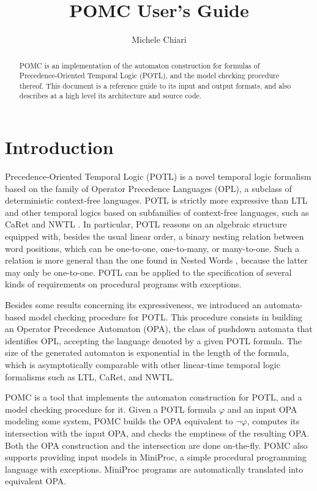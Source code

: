 \documentclass[9pt,a4paper]{article}
\title{POMC User's Guide}
\author{Michele Chiari}
\date{}
\begin{document}
\maketitle

\begin{abstract}
POMC is an implementation of the automaton construction for formulas
of Precedence-Oriented Temporal Logic (POTL), and the model checking
procedure thereof.
This document is a reference guide to its input and output formats,
and also describes at a high level its architecture and source code.
\end{abstract}

\section{Introduction}

Precedence-Oriented Temporal Logic (POTL) \cite{ChiariMP21} is a novel temporal
logic formalism based on the family of Operator Precedence Languages (OPL),
a subclass of deterministic context-free languages.
POTL is strictly more expressive than LTL and other temporal logics based
on subfamilies of context-free languages, such as CaRet \cite{AlurEM04}
and NWTL \cite{lmcs/AlurABEIL08}.
In particular, POTL reasons on an algebraic structure equipped with,
besides the usual linear order, a binary nesting relation between word positions,
which can be one-to-one, one-to-many, or many-to-one.
Such a relation is more general than the one found in Nested Words \cite{jacm/AlurM09},
because the latter may only be one-to-one.
POTL can be applied to the specification of several kinds of requirements
on procedural programs with exceptions.

Besides some results concerning its expressiveness,
we introduced an automata-based model checking procedure for POTL.
This procedure consists in building an Operator Precedence Automaton (OPA),
the class of pushdown automata that identifies OPL,
accepting the language denoted by a given POTL formula.
The size of the generated automaton is exponential in the length of the formula,
which is asymptotically comparable with other linear-time temporal logic
formalisms such as LTL, CaRet, and NWTL.

POMC is a tool that implements the automaton construction
for POTL, and a model checking procedure for it.
Given a POTL formula $\varphi$ and an input OPA modeling some system,
POMC builds the OPA equivalent to $\neg \varphi$, computes its intersection
with the input OPA, and checks the emptiness of the resulting OPA.
Both the OPA construction and the intersection are done on-the-fly.
POMC also supports providing input models in MiniProc,
a simple procedural programming language with exceptions.
MiniProc programs are automatically translated into equivalent OPA.
\end{document}
